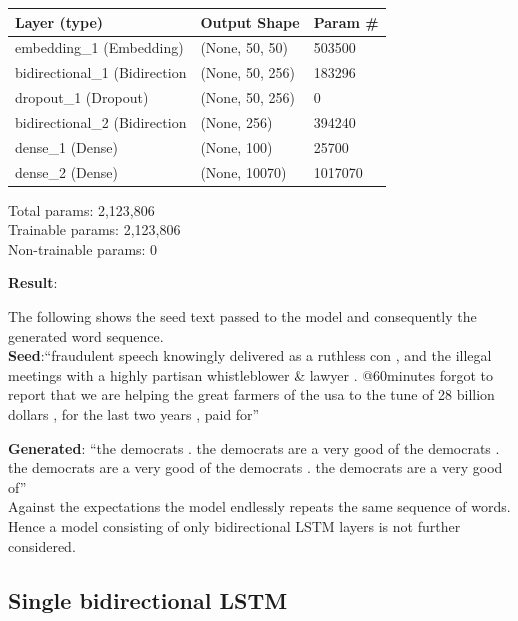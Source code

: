 \documentclass[conference]{IEEEtran}
\begin{document}
\begin{center}
\begin{tabular}{l l l}
\hline
Layer (type) & Output Shape & Param \#\\
\hline
\hline
embedding\_1 (Embedding) & (None, 50, 50) & 503500\\
\hline
bidirectional\_1 (Bidirection & (None, 50, 256) & 183296\\
\hline
dropout\_1 (Dropout) & (None, 50, 256) & 0\\
\hline
bidirectional\_2 (Bidirection & (None, 256) & 394240\\
\hline
dense\_1 (Dense) & (None, 100) & 25700\\
\hline
dense\_2 (Dense) & (None, 10070) & 1017070\\
\hline
\hline
\end{tabular}
\begin{flushleft}
Total params: 2,123,806\\
Trainable params: 2,123,806\\
Non-trainable params: 0
\end{flushleft}
\end{center}

\textbf{Result}:

The following shows the seed text passed to the model and consequently the generated word sequence.\\

\textbf{Seed}:``fraudulent speech knowingly delivered as a ruthless con , and the illegal meetings with a highly partisan whistleblower \& lawyer . @60minutes forgot to report that we are helping the great farmers of the usa to the tune of 28 billion dollars , for the last two years , paid for''

\textbf{Generated}: ``the democrats . the democrats are a very good of the democrats . the democrats are a very good of the democrats . the democrats are a very good of''\\

Against the expectations the model endlessly repeats the same sequence of words. Hence a model consisting of only bidirectional LSTM layers is not further considered.

\subsection{Single bidirectional LSTM}
\end{document}
